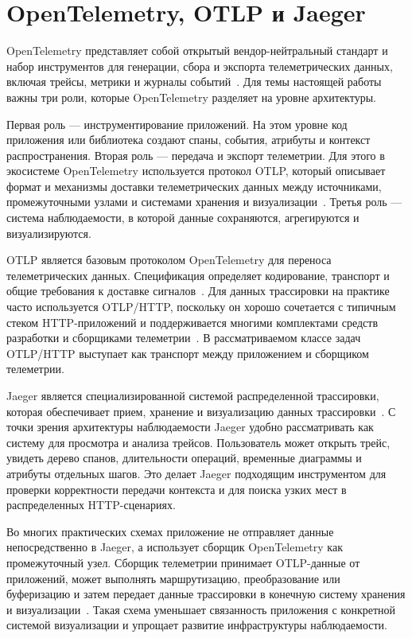\section{OpenTelemetry, OTLP и Jaeger}

OpenTelemetry представляет собой открытый вендор-нейтральный стандарт и набор
инструментов для генерации, сбора и экспорта телеметрических данных, включая
трейсы, метрики и журналы событий~\cite{otelDocs,otelWhatIs}. Для темы настоящей
работы важны три роли, которые OpenTelemetry разделяет на уровне архитектуры.

Первая роль --- инструментирование приложений. На этом уровне код приложения или
библиотека создают спаны, события, атрибуты и контекст распространения. Вторая
роль --- передача и экспорт телеметрии. Для этого в экосистеме OpenTelemetry
используется протокол OTLP, который описывает формат и механизмы доставки
телеметрических данных между источниками, промежуточными узлами и системами
хранения и визуализации~\cite{otlpSpec,otlpExporterSpec}. Третья роль --- система
наблюдаемости, в которой данные сохраняются, агрегируются и визуализируются.

OTLP является базовым протоколом OpenTelemetry для переноса телеметрических
данных. Спецификация определяет кодирование, транспорт и общие требования к
доставке сигналов~\cite{otlpSpec}. Для данных трассировки на практике часто
используется OTLP/HTTP, поскольку он хорошо сочетается с типичным стеком
HTTP-приложений и поддерживается многими комплектами средств разработки и
сборщиками телеметрии~\cite{otlpExporterSpec}. В рассматриваемом классе задач
OTLP/HTTP выступает как транспорт между приложением и сборщиком телеметрии.

Jaeger является специализированной системой распределенной трассировки, которая
обеспечивает прием, хранение и визуализацию данных трассировки~\cite{jaegerDocs,jaegerArchitecture}.
С точки зрения архитектуры наблюдаемости Jaeger удобно рассматривать как систему
для просмотра и анализа трейсов. Пользователь может открыть трейс, увидеть дерево
спанов, длительности операций, временные диаграммы и атрибуты отдельных шагов.
Это делает Jaeger подходящим инструментом для проверки корректности передачи
контекста и для поиска узких мест в распределенных HTTP-сценариях.

Во многих практических схемах приложение не отправляет данные непосредственно в
Jaeger, а использует сборщик OpenTelemetry как промежуточный узел. Сборщик
телеметрии принимает OTLP-данные от приложений, может выполнять маршрутизацию,
преобразование или буферизацию и затем передает данные трассировки в конечную
систему хранения и визуализации~\cite{jaegerArchitecture,otlpSpec}. Такая схема
уменьшает связанность приложения с конкретной системой визуализации и упрощает
развитие инфраструктуры наблюдаемости.


